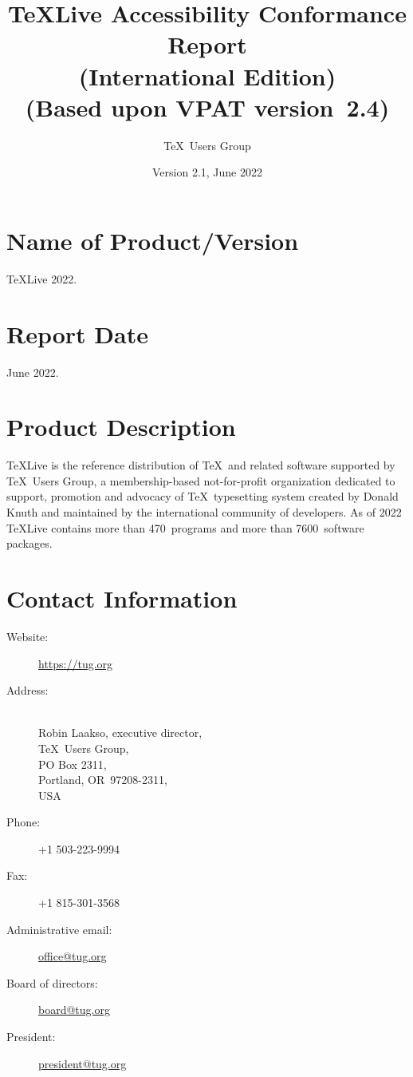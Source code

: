 \documentclass{report}
\begin{document}
\title{\TeX Live Accessibility Conformance Report\\
  (International Edition)\\
(Based upon VPAT\textsuperscript{\textregistered} version~2.4)}
\author{\TeX\ Users Group}
\date{Version 2.1, June 2022}
\maketitle

\clearpage

\tableofcontents

\clearpage

\section{Name of Product/Version}
\label{sec:name}

\TeX Live 2022.


\section{Report Date}
\label{sec:date}

June 2022.


\section{Product Description}
\label{sec:description}

\TeX Live is the reference distribution of \TeX\ and related software
supported by \TeX\ Users Group, a membership-based not-for-profit
organization dedicated to support, promotion and advocacy of \TeX\
typesetting system created by Donald Knuth and maintained by the
international community of developers.  As of 2022 \TeX Live contains
more than 470~programs and more than 7600~software packages.

\section{Contact Information}
\label{sec:contact_info}

  \begin{description}
  \item[Website:]  \url{https://tug.org}
  \item[Address:] \leavevmode\\
    Robin Laakso, executive director,\\
    \TeX\ Users Group,\\
    PO Box 2311,\\
    Portland, OR~97208-2311,\\
    USA
  \item[Phone:] +1 503-223-9994
  \item[Fax:] +1 815-301-3568
  \item[Administrative email:] \href{mailto:office@tug.org}{office@tug.org}
  \item[Board of directors:] \href{mailto:board@tug.org}{board@tug.org}
  \item[President:] \href{mailto:president@tug.org}{president@tug.org}
  \end{description}
\end{document}
